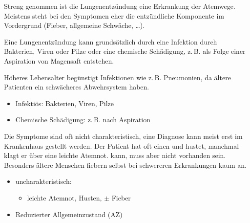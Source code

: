 
Streng genommen ist die Lungenentzündung eine Erkrankung der
Atemwege. Meistens steht bei den Symptomen eher die
entzündliche Komponente im Vordergrund (Fieber, allgemeine
Schwäche, \ldots).

{%
Eine Lungenentzündung kann grundsätzlich durch eine
Infektion durch Bakterien, Viren oder
Pilze oder eine
chemische Schädigung, z.\,B. als Folge einer Aspiration von
Magensaft
   entstehen.

Höheres Lebensalter begünstigt Infektionen wie z.\,B.
Pneumonien, da ältere Patienten ein schwächeres Abwehrsystem
haben.
}{
\begin{itemize}
  \item Infektiös: Bakterien, Viren, Pilze
  \item Chemische Schädigung: z.\,B. nach
  Aspiration
\end{itemize}
}{}{}{}


{%
Die Symptome sind oft nicht charakteristisch, eine Diagnose
kann meist erst im Krankenhaus gestellt werden. Der Patient
hat oft einen  und hustet,
manchmal klagt er über eine leichte Atemnot. 
kann, muss aber nicht vorhanden sein. Besonders ältere
Menschen fiebern selbst bei schwereren Erkrankungen kaum an.

\bigskip

\bigskip
}{
\begin{itemize}
  \item uncharakteristisch:
  \begin{itemize}
    \item leichte Atemnot, Husten,  $\pm$ Fieber
  \end{itemize}
  \item Reduzierter Allgemeinzustand (AZ)
\end{itemize}
}{}{}{}




% 



